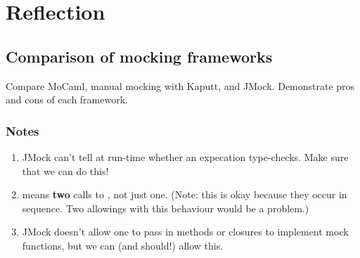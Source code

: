 \chapter{Reflection}
\label{reflection}

\section{Comparison of mocking frameworks}
\label{application:comparison}

Compare MoCaml, manual mocking with Kaputt, and JMock. Demonstrate
pros and cons of each framework.

\subsection{Notes}

\begin{enumerate}
\item JMock can't tell at run-time whether an expecation
  type-checks. Make sure that we can do this!
\item {} means \textbf{two}
  calls to , not just one. (Note: this is okay because
  they occur in sequence. Two allowings with this behaviour would be a
  problem.)
\item JMock doesn't allow one to pass in methods or closures to
  implement mock functions, but we can (and should!) allow this.
\end{enumerate}